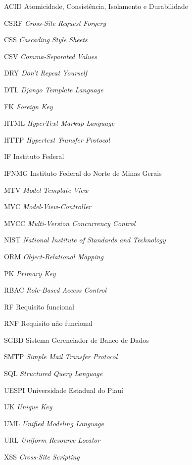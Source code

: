
\begin{siglas}
  \item[ACID] Atomicidade, Consistência, Isolamento e Durabilidade
  \item[CSRF] \textit{Cross-Site Request Forgery}
  \item[CSS] \textit{Cascading Style Sheets}
  \item[CSV] \textit{Comma-Separated Values}
  \item[DRY] \textit{Don't Repeat Yourself}
  \item[DTL] \textit{Django Template Language}
  \item[FK] \textit{Foreign Key}
  \item[HTML] \textit{HyperText Markup Language}
  \item[HTTP] \textit{Hypertext Transfer Protocol}
  \item[IF] Instituto Federal
  \item[IFNMG] Instituto Federal do Norte de Minas Gerais
  \item[MTV] \textit{Model-Template-View}
  \item[MVC] \textit{Model-View-Controller}
  \item[MVCC] \textit{Multi-Version Concurrency Control}
  \item[NIST] \textit{National Institute of Standards and Technology}
  \item[ORM] \textit{Object-Relational Mapping}
  \item[PK] \textit{Primary Key}
  \item[RBAC] \textit{Role-Based Access Control}
  \item[RF] Requisito funcional
  \item[RNF] Requisito não funcional
  \item[SGBD] Sistema Gerenciador de Banco de Dados
  \item[SMTP] \textit{Simple Mail Transfer Protocol}
  \item[SQL] \textit{Structured Query Language}
  \item[UESPI] Universidade Estadual do Piauí
  \item[UK] \textit{Unique Key}
  \item[UML] \textit{Unified Modeling Language}
  \item[URL] \textit{Uniform Resource Locator}
  \item[XSS] \textit{Cross-Site Scripting}
\end{siglas}